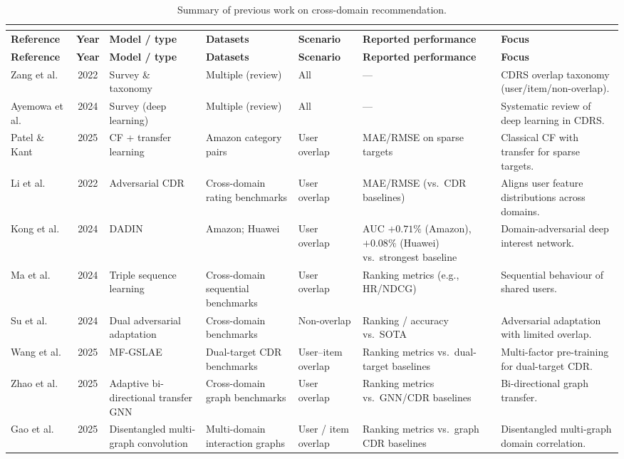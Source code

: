 \documentclass[pdflatex,sn-mathphys-num]{sn-jnl}%
\theoremstyle{thmstyleone}%
\theoremstyle{thmstyletwo}%
\theoremstyle{thmstylethree}%
\begin{document}
{\scriptsize
\setlength{\tabcolsep}{2.5pt}
\renewcommand{\arraystretch}{1.15}
\begin{longtable}{p{2.4cm} c p{2.1cm} p{2.0cm} p{1.7cm} p{2.4cm} p{2.6cm}}
\caption{Summary of previous work on cross-domain recommendation.}\\
\label{tab:related_work_summary}\\
\toprule
\textbf{Reference} & \textbf{Year} & \textbf{Model / type} & \textbf{Datasets} & \textbf{Scenario} & \textbf{Reported performance} & \textbf{Focus}\\
\midrule
\endfirsthead
\toprule
\textbf{Reference} & \textbf{Year} & \textbf{Model / type} & \textbf{Datasets} & \textbf{Scenario} & \textbf{Reported performance} & \textbf{Focus}\\
\midrule
\endhead
\bottomrule
\endfoot
\bottomrule
\endlastfoot
Zang et al.~\cite{zang2022survey} & 2022 & Survey \& taxonomy & Multiple (review) & All & --- & CDRS overlap taxonomy (user/item/non-overlap). \\
Ayemowa et al.~\cite{ayemowa2024systematic} & 2024 & Survey (deep learning) & Multiple (review) & All & --- & Systematic review of deep learning in CDRS. \\
Patel \& Kant~\cite{patel2025enhanced} & 2025 & CF + transfer learning & Amazon category pairs & User overlap & MAE/RMSE on sparse targets & Classical CF with transfer for sparse targets. \\
Li et al.~\cite{li2022adversarial} & 2022 & Adversarial CDR & Cross-domain rating benchmarks & User overlap & MAE/RMSE (vs.\ CDR baselines) & Aligns user feature distributions across domains. \\
Kong et al.~\cite{kong2024dadin} & 2024 & DADIN & Amazon; Huawei & User overlap & AUC $+0.71\%$ (Amazon), $+0.08\%$ (Huawei) vs.\ strongest baseline & Domain-adversarial deep interest network. \\
Ma et al.~\cite{ma2024triple} & 2024 & Triple sequence learning & Cross-domain sequential benchmarks & User overlap & Ranking metrics (e.g., HR/NDCG) & Sequential behaviour of shared users. \\
Su et al.~\cite{su2024cross} & 2024 & Dual adversarial adaptation & Cross-domain benchmarks & Non-overlap & Ranking / accuracy vs.\ SOTA & Adversarial adaptation with limited overlap. \\
Wang et al.~\cite{wang2025mf} & 2025 & MF-GSLAE & Dual-target CDR benchmarks & User--item overlap & Ranking metrics vs.\ dual-target baselines & Multi-factor pre-training for dual-target CDR. \\
Zhao et al.~\cite{zhao2025cross} & 2025 & Adaptive bi-directional transfer GNN & Cross-domain graph benchmarks & User overlap & Ranking metrics vs.\ GNN/CDR baselines & Bi-directional graph transfer. \\
Gao et al.~\cite{gao2025disentangled} & 2025 & Disentangled multi-graph convolution & Multi-domain interaction graphs & User / item overlap & Ranking metrics vs.\ graph CDR baselines & Disentangled multi-graph domain correlation. \\
\end{longtable}
}
\end{document}
